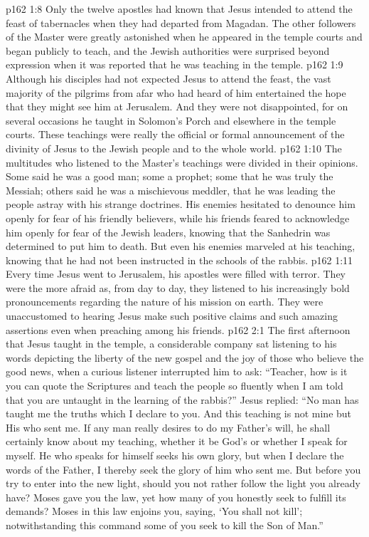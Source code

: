 \vs p162 1:8 Only the twelve apostles had known that Jesus intended to attend the feast of tabernacles when they had departed from Magadan. The other followers of the Master were greatly astonished when he appeared in the temple courts and began publicly to teach, and the Jewish authorities were surprised beyond expression when it was reported that he was teaching in the temple.
\vs p162 1:9 Although his disciples had not expected Jesus to attend the feast, the vast majority of the pilgrims from afar who had heard of him entertained the hope that they might see him at Jerusalem. And they were not disappointed, for on several occasions he taught in Solomon’s Porch and elsewhere in the temple courts. These teachings were really the official or formal announcement of the divinity of Jesus to the Jewish people and to the whole world.
\vs p162 1:10 The multitudes who listened to the Master’s teachings were divided in their opinions. Some said he was a good man; some a prophet; some that he was truly the Messiah; others said he was a mischievous meddler, that he was leading the people astray with his strange doctrines. His enemies hesitated to denounce him openly for fear of his friendly believers, while his friends feared to acknowledge him openly for fear of the Jewish leaders, knowing that the Sanhedrin was determined to put him to death. But even his enemies marveled at his teaching, knowing that he had not been instructed in the schools of the rabbis.
\vs p162 1:11 Every time Jesus went to Jerusalem, his apostles were filled with terror. They were the more afraid as, from day to day, they listened to his increasingly bold pronouncements regarding the nature of his mission on earth. They were unaccustomed to hearing Jesus make such positive claims and such amazing assertions even when preaching among his friends.
\vs p162 2:1 The first afternoon that Jesus taught in the temple, a considerable company sat listening to his words depicting the liberty of the new gospel and the joy of those who believe the good news, when a curious listener interrupted him to ask: “Teacher, how is it you can quote the Scriptures and teach the people so fluently when I am told that you are untaught in the learning of the rabbis?” Jesus replied: \textcolor{ubdarkred}{“No man has taught me the truths which I declare to you. And this teaching is not mine but His who sent me. If any man really desires to do my Father’s will, he shall certainly know about my teaching, whether it be God’s or whether I speak for myself. He who speaks for himself seeks his own glory, but when I declare the words of the Father, I thereby seek the glory of him who sent me. But before you try to enter into the new light, should you not rather follow the light you already have? Moses gave you the law, yet how many of you honestly seek to fulfill its demands? Moses in this law enjoins you, saying, ‘You shall not kill’; notwithstanding this command some of you seek to kill the Son of Man.”}
